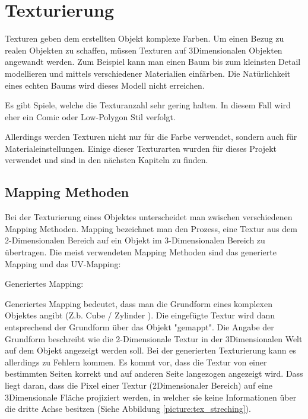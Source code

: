 \section{Texturierung}
\label{sec:tex}
Texturen geben dem erstellten Objekt komplexe Farben. Um einen Bezug zu realen Objekten zu schaffen, müssen Texturen
auf 3Dimensionalen Objekten angewandt werden. Zum Beispiel kann man einen Baum bis
zum kleinsten Detail modellieren und mittels verschiedener Materialien einfärben. Die Natürlichkeit
eines echten Baums wird dieses Modell nicht erreichen.

Es gibt Spiele, welche die Texturanzahl sehr gering halten. In diesem Fall wird eher ein Comic
oder Low-Polygon Stil verfolgt.

Allerdings werden Texturen nicht nur für die Farbe verwendet, sondern auch für Materialeinstellungen.
Einige dieser Texturarten wurden für dieses Projekt verwendet und
sind in den nächsten Kapiteln zu finden.

\subsection{Mapping Methoden}
\label{sec:tex_mapping}

Bei der Texturierung eines Objektes unterscheidet man zwischen verschiedenen Mapping Methoden. Mapping bezeichnet man
den Prozess, eine Textur aus dem 2-Dimensionalen Bereich auf ein Objekt im 3-Dimensionalen Bereich zu übertragen. Die
meist verwendeten Mapping Methoden sind das generierte Mapping und das UV-Mapping\citep{blender:tex_mapping_modes}:


Generiertes Mapping:

Generiertes Mapping bedeutet, dass man die Grundform eines komplexen Objektes angibt (Z.b. Cube / Zylinder ). Die
eingefügte Textur wird dann entsprechend der Grundform über das Objekt "gemappt". Die Angabe der Grundform beschreibt
wie die 2-Dimensionale Textur in der 3Dimensionalen Welt auf dem Objekt angezeigt werden soll.
Bei der generierten Texturierung kann es allerdings zu Fehlern kommen. Es kommt vor, dass die Textur von einer
bestimmten Seiten korrekt und auf anderen Seite langezogen angezeigt wird. Dass liegt daran, dass die Pixel einer
Textur (2Dimensionaler Bereich) auf eine 3Dimensionale Fläche projiziert werden, in welcher sie keine Informationen
über die dritte Achse besitzen (Siehe Abbildung \ref{picture:tex_streching}).


